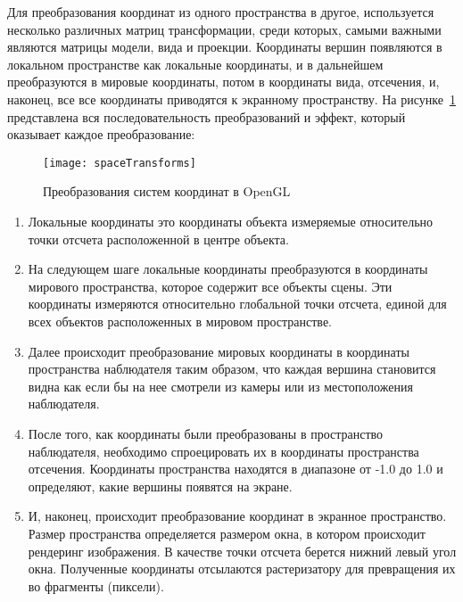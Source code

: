 Для преобразования координат из одного пространства в другое,
используется несколько различных матриц трансформации, среди которых, самыми важными
являются матрицы модели, вида и проекции. Координаты вершин появляются в
локальном пространстве как локальные координаты, и в дальнейшем преобразуются в
мировые координаты, потом в координаты вида, отсечения, и, наконец, все
все координаты приводятся к экранному пространству. На
рисунке~\ref{fig:spaceTransforms} представлена вся последовательность
преобразований и эффект, который оказывает каждое преобразование:
\begin{figure}[htb]
	\centering
	\texttt{[image: spaceTransforms]}
	\caption{Преобразования систем координат в OpenGL}%
    \label{fig:spaceTransforms}
\end{figure}
\begin{enumerate}
    \item Локальные координаты это координаты объекта измеряемые относительно
        точки отсчета расположенной в центре объекта.

    \item На следующем шаге локальные координаты преобразуются в координаты
        мирового пространства, которое содержит все объекты сцены. Эти
        координаты измеряются относительно глобальной точки отсчета, единой для
        всех объектов расположенных в мировом пространстве.

    \item Далее происходит преобразование мировых координаты в координаты
        пространства наблюдателя таким образом, что каждая вершина становится
        видна как если бы на нее смотрели из камеры или из местоположения
        наблюдателя.

    \item После того, как координаты были преобразованы в пространство
        наблюдателя, необходимо спроецировать их в координаты пространства
        отсечения. Координаты пространства находятся в диапазоне от -1.0 до 1.0
        и определяют, какие вершины появятся на экране.

    \item И, наконец, происходит преобразование координат в экранное
        пространство. Размер пространства определяется размером окна, в котором
        происходит рендеринг изображения. В качестве точки отсчета берется
        нижний левый угол окна. Полученные координаты отсылаются растеризатору
        для превращения их во фрагменты (пиксели).
\end{enumerate}

